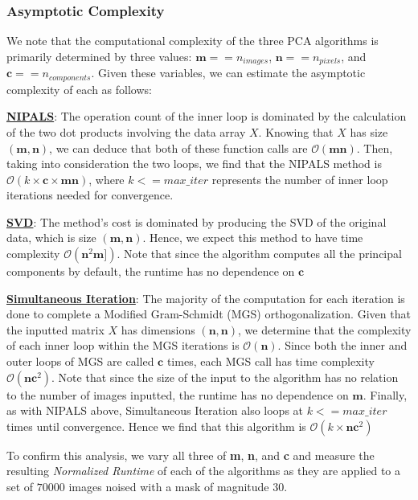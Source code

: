 \documentclass[12pt]{article}
\begin{document}
\subsubsection{Asymptotic Complexity}\label{5.1.1}

We note that the computational complexity of the three PCA algorithms is primarily determined by three values: $\textbf{m} == n_{images}$, $\textbf{n} == n_{pixels}$, and $\textbf{c} == n_{components}$.  Given these variables, we can estimate the asymptotic complexity of each as follows:

\textbf{\hyperref[3.1]{NIPALS}}: The operation count of the inner loop is dominated by the calculation of the two dot products involving the data array $X$. Knowing that $X$ has size $(\textbf{m}, \textbf{n})$, we can deduce that both of these function calls are $\mathcal{O}(\textbf{m}\textbf{n})$. Then, taking into consideration the two loops, we find that the NIPALS method is $\mathcal{O}(k \times \textbf{c} \times \textbf{m}\textbf{n})$, where $k<=max\_iter$ represents the number of inner loop iterations needed for convergence.

\textbf{\hyperref[3.2]{SVD}}: The method's cost is dominated by producing the SVD of the original data, which is size $(\textbf{m}, \textbf{n})$. Hence, we expect this method to have time complexity $\mathcal{O}(\textbf{n}^2 \textbf{m} ])$. Note that since the algorithm computes all the principal components by default, the runtime has no dependence on $\textbf{c}$

\textbf{\hyperref[3.3]{Simultaneous Iteration}}: The majority of the computation for each iteration is done to complete a Modified Gram-Schmidt (MGS) orthogonalization. Given that the inputted matrix $X$ has dimensions $(\textbf{n}, \textbf{n})$, we determine that the complexity of each inner loop within the MGS iterations is $\mathcal{O}(\textbf{n})$. Since both the inner and outer loops of MGS are called $\textbf{c}$ times, each MGS call has time complexity $\mathcal{O}(\textbf{n}\textbf{c}^2)$. Note that since the size of the input to the algorithm has no relation to the number of images inputted, the runtime has no dependence on $\textbf{m}$. Finally, as with NIPALS above, Simultaneous Iteration also loops at $k <=max\_iter$ times until convergence. Hence we find that this algorithm is $\mathcal{O}(k \times \textbf{n}\textbf{c}^2)$

To confirm this analysis, we vary all three of \textbf{m}, \textbf{n}, and \textbf{c} and measure the resulting \textit{Normalized Runtime} of each of the algorithms as they are applied to a set of $70000$ images noised with a mask of magnitude $30$.
\end{document}
